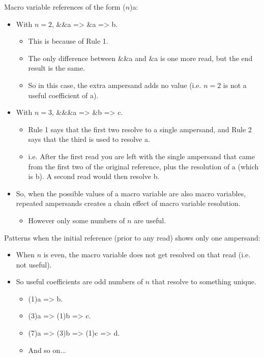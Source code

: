 \documentclass[11pt, oneside]{article}
\begin{document}
Macro variable references of the form ($n$)a:
\begin{itemize}
\item With $n=2$, \&\&a => \&a => b.
	\begin{itemize}
	\item This is because of Rule 1.
	\item The only difference between  \&\&a and \&a is one more read, but the end 	result is the same.
	\item So in this case, the extra ampersand adds no value (i.e. $n=2$ is not a useful coefficient of a).
	\end{itemize}
\item With $n=3$, \&\&\&a => \&b => c.
	\begin{itemize}
	\item Rule 1 says that the first two resolve to a single ampersand, and Rule 2 says that the third is used to resolve a.
	\item i.e. After the first read you are left with the single ampersand that came from the first two of the original reference, plus the resolution of a (which is b). A second read would then resolve b.
	\end{itemize}
\item So, when the possible values of a macro variable are also macro variables, repeated ampersands creates a chain effect of macro variable resolution.
	\begin{itemize}
	\item However only some numbers of $n$ are useful.
	\end{itemize}
\end{itemize}

Patterns when the initial reference (prior to any read) shows only one ampersand:
\begin{itemize}
\item When $n$ is even, the macro variable does not get resolved on that read (i.e. not useful).
\item So useful coefficients are odd numbers of $n$ that resolve to something unique.
	\begin{itemize}
	\item (1)a => b.
	\item (3)a => (1)b => c.
	\item (7)a => (3)b => (1)c => d.
	\item And so on...
	\end{itemize}
\end{itemize}
\end{document}
